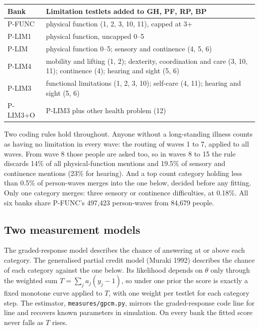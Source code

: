 \documentclass[11pt]{article}
\newcommand{\code}[1]{\texttt{\small #1}}
\begin{document}
\begin{center}\small
\begin{tabular}{@{}l>{\raggedright\arraybackslash}p{12.6cm}@{}}
\toprule
Bank & Limitation testlets added to GH, PF, RP, BP \\
\midrule
P-FUNC & physical function (1, 2, 3, 10, 11), capped at 3+ \\
P-LIM1 & physical function, uncapped 0--5 \\
P-LIM & physical function 0--5; sensory and continence (4, 5, 6) \\
P-LIM4 & mobility and lifting (1, 2); dexterity, coordination and care (3, 10, 11); continence (4); hearing and sight (5, 6) \\
P-LIM3 & functional limitations (1, 2, 3, 10); self-care (4, 11); hearing and sight (5, 6) \\
P-LIM3+O & P-LIM3 plus other health problem (12) \\
\bottomrule
\end{tabular}
\end{center}

Two coding rules hold throughout. Anyone without a long-standing illness
counts as having no limitation in every wave: the routing of waves 1 to 7,
applied to all waves. From wave 8 those people are asked too, so in waves 8
to 15 the rule discards 14\% of all physical-function mentions and 19.5\% of
sensory and continence mentions (23\% for hearing). And a top count category holding less
than 0.5\% of person-waves merges into the one below, decided before any
fitting. Only one category merges: three sensory or continence difficulties,
at 0.18\%. All six banks share P-FUNC's 497{,}423 person-waves from 84{,}679
people.



\subsection{Two measurement models}
The graded-response model describes the chance of answering at or above each
category. The generalised partial credit model (Muraki 1992) describes the
chance of each category against the one below. Its likelihood depends on
$\theta$ only through the weighted sum $T=\sum_j a_j(y_j-1)$, so under one
prior the score is exactly a fixed monotone curve applied to $T$, with one
weight per testlet for each category step. The estimator,
\code{measures/gpcm.py}, mirrors the graded-response code line for line and
recovers known parameters in simulation. On every bank the fitted score never
falls as $T$ rises.
\end{document}
